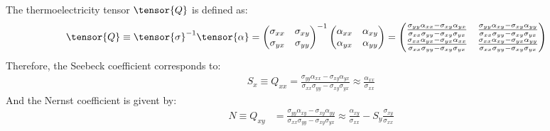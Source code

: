 \documentclass[notitlepage,11pt,nofootinbib]{revtex4-1}
\begin{document}
The thermoelectricity tensor $\tensor{Q}$ is defined as:
\begin{align}
\tensor{Q} &\equiv \tensor{\sigma}^{-1}\tensor{\alpha}
=
\begin{pmatrix}
\sigma_{xx} & \sigma_{xy}\\
\sigma_{yx} & \sigma_{yy}
\end{pmatrix}^{-1}
\begin{pmatrix}
\alpha_{xx} & \alpha_{xy}\\
\alpha_{yx} & \alpha_{yy}
\end{pmatrix}
=
\begin{pmatrix}
  \frac{\sigma_{yy}\alpha_{xx}-\sigma_{xy}\alpha_{yx}}
  {\sigma_{xx}\sigma_{yy}-\sigma_{xy}\sigma_{yx}} 
& \frac{\sigma_{yy}\alpha_{xy}-\sigma_{xy}\alpha_{yy}}
  {\sigma_{xx}\sigma_{yy}-\sigma_{xy}\sigma_{yx}}\\
  \frac{\sigma_{xx}\alpha_{yx}-\sigma_{yx}\alpha_{xx}}
  {\sigma_{xx}\sigma_{yy}-\sigma_{xy}\sigma_{yx}}
& \frac{\sigma_{xx}\alpha_{xy}-\sigma_{yx}\alpha_{yy}}
  {\sigma_{xx}\sigma_{yy}-\sigma_{xy}\sigma_{yx}}
\end{pmatrix}
\end{align}
Therefore, the Seebeck coefficient corresponds to:
\begin{align}
S_x
\equiv 
Q_{xx} 
=
\frac{\sigma_{yy}\alpha_{xx}-\sigma_{xy}\alpha_{yx}}{\sigma_{xx}\sigma_{yy}-\sigma_{xy}\sigma_{yx}} 
\approx 
\boxed{
\frac{\alpha_{xx}}{\sigma_{xx}}
}
\label{eq_seebeck}
\end{align}
And the Nernst coefficient is givent by:
\begin{align}
N 
\equiv
Q_{xy}
&= 
\frac{\sigma_{yy}\alpha_{xy}-\sigma_{xy}\alpha_{yy}}
{\sigma_{xx}\sigma_{yy}-\sigma_{xy}\sigma_{yx}}
\approx 
\boxed{
\frac{\alpha_{xy}}{\sigma_{xx}}
- S_{y}\frac{\sigma_{xy}}{\sigma_{xx}}
}
\end{align}
\end{document}
